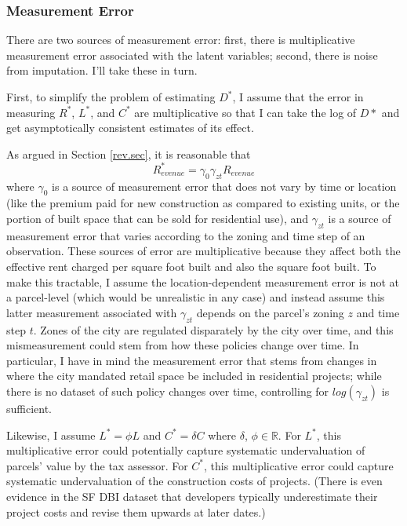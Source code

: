 \documentclass[a4paper,12pt]{article}
\begin{document}
\subsubsection{Measurement Error}

There are two sources of measurement error: first, there is multiplicative measurement error associated with the latent variables; second, there is noise from imputation. I'll take these in turn. 

First, to simplify the problem of estimating $D^*$, I assume that the error in measuring $R^*$, $L^*$, and $C^*$ are multiplicative so that I can take the log of $D*$ and get asymptotically consistent estimates of its effect. 

As argued in Section \ref{rev.sec}, it is reasonable that
\[
R^{*}_{evenue} = \gamma_0  \gamma_{zt} R_{evenue}  
\]
where $\gamma_0$ is a
source of measurement error that does not vary by time or location (like the premium paid for new construction as compared to existing units, or the portion of built space that can be sold for residential use), and $\gamma_{zt}$ is a source of measurement error that varies according to the zoning and time step of an observation. These sources of error are multiplicative because they affect both the effective rent charged per square foot built and also the square foot built. To make this tractable, I assume the location-dependent measurement error is not at a parcel-level (which would be unrealistic in any case) and instead assume this latter measurement associated with $\gamma_{zt}$ depends on the parcel's zoning $z$ and time step $t$. Zones of the city are regulated disparately by the city over time, and this mismeasurement could stem from how these policies change over time. In particular, I have in mind the measurement error that stems from changes in where the city mandated retail space be included in residential projects; while there is no dataset of such policy changes over time, controlling for $log(\gamma_{zt})$ is sufficient.

Likewise, I assume $L^* = \phi L$ and $C^* = \delta C$ where $\delta$, $\phi \in \mathbb{R}$. For $L^*$, this multiplicative error could potentially capture systematic undervaluation of parcels' value by the tax assessor. For $C^*$, this multiplicative error could capture systematic undervaluation of the construction costs of projects. (There is even evidence in the SF DBI dataset that developers typically underestimate their project costs and revise them upwards at later dates.) 
\end{document}
